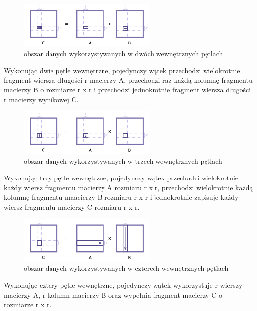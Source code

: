 \documentclass[12pt,a4paper]{article}
\begin{document}
\begin{figure}[H]
  \centering
    \includegraphics[width=0.60\textwidth]{IJKIJK_KKJJ.jpg}
    \caption{obszar danych wykorzystywanych w dwóch wewnętrznych pętlach}
\end{figure}

Wykonując dwie pętle wewnętrzne, pojedynczy wątek przechodzi wielokrotnie fragment wiersza długości r macierzy A, przechodzi raz każdą kolumnę fragmentu macierzy B o rozmiarze r x r i przechodzi jednokrotnie fragment wiersza długości r macierzy wynikowej C.

\begin{figure}[H]
  \centering
    \includegraphics[width=0.60\textwidth]{IJKIJK_KKJJII.jpg}
    \caption{obszar danych wykorzystywanych w trzech wewnętrznych pętlach}
\end{figure}

Wykonując trzy pętle wewnętrzne, pojedynczy wątek przechodzi wielokrotnie każdy wiersz fragmentu macierzy A rozmiaru r x r, przechodzi wielokrotnie każdą kolumnę fragmentu maacierzy B rozmiaru r x r i jednokrotnie zapisuje każdy wiersz fragmentu macierzy C rozmiaru r x r.

\begin{figure}[H]
  \centering
    \includegraphics[width=0.60\textwidth]{IJKIJK_KKJJIIK.jpg}
    \caption{obszar danych wykorzystywanych w czterech wewnętrznych pętlach}
\end{figure}

Wykonując cztery pętle wewnętrzne, pojedynczy wątek wykorzystuje r wierszy macierzy A, r kolumn macierzy B oraz wypełnia fragment macierzy C o rozmiarze r x r.
\end{document}
